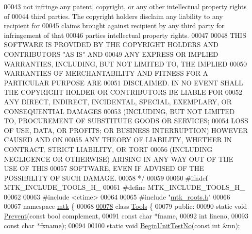 \begin{DoxyCode}
00043 \textcolor{comment}{not infringe any patent, copyright, or any other intellectual property rights of}
00044 \textcolor{comment}{third parties. The copyright holders disclaim any liability to any recipient for}
00045 \textcolor{comment}{claims brought against recipient by any third party for infringement of that}
00046 \textcolor{comment}{parties intellectual property rights.}
00047 \textcolor{comment}{}
00048 \textcolor{comment}{THIS SOFTWARE IS PROVIDED BY THE COPYRIGHT HOLDERS AND CONTRIBUTORS "AS IS" AND}
00049 \textcolor{comment}{ANY EXPRESS OR IMPLIED WARRANTIES, INCLUDING, BUT NOT LIMITED TO, THE IMPLIED}
00050 \textcolor{comment}{WARRANTIES OF MERCHANTABILITY AND FITNESS FOR A PARTICULAR PURPOSE ARE}
00051 \textcolor{comment}{DISCLAIMED. IN NO EVENT SHALL THE COPYRIGHT HOLDER OR CONTRIBUTORS BE LIABLE FOR}
00052 \textcolor{comment}{ANY DIRECT, INDIRECT, INCIDENTAL, SPECIAL, EXEMPLARY, OR CONSEQUENTIAL DAMAGES}
00053 \textcolor{comment}{(INCLUDING, BUT NOT LIMITED TO, PROCUREMENT OF SUBSTITUTE GOODS OR SERVICES;}
00054 \textcolor{comment}{LOSS OF USE, DATA, OR PROFITS; OR BUSINESS INTERRUPTION) HOWEVER CAUSED AND ON}
00055 \textcolor{comment}{ANY THEORY OF LIABILITY, WHETHER IN CONTRACT, STRICT LIABILITY, OR TORT}
00056 \textcolor{comment}{(INCLUDING NEGLIGENCE OR OTHERWISE) ARISING IN ANY WAY OUT OF THE USE OF THIS}
00057 \textcolor{comment}{SOFTWARE, EVEN IF ADVISED OF THE POSSIBILITY OF SUCH DAMAGE.}
00058 \textcolor{comment}{*/}
00059 
00060 \textcolor{preprocessor}{#ifndef MTK\_INCLUDE\_TOOLS\_H\_}
00061 \textcolor{preprocessor}{#define MTK\_INCLUDE\_TOOLS\_H\_}
00062 
00063 \textcolor{preprocessor}{#include <ctime>}
00064 
00065 \textcolor{preprocessor}{#include "\hyperlink{mtk__roots_8h}{mtk\_roots.h}"}
00066 
00067 \textcolor{keyword}{namespace }\hyperlink{namespacemtk}{mtk} \{
00068 
\hypertarget{mtk__tools_8h_source_l00078}{}\hyperlink{classmtk_1_1Tools}{00078} \textcolor{keyword}{class }\hyperlink{classmtk_1_1Tools}{Tools} \{
00079  \textcolor{keyword}{public}:
00090   \textcolor{keyword}{static} \textcolor{keywordtype}{void} \hyperlink{classmtk_1_1Tools_afe5bb096309258e2e72503fd7b41c7e0}{Prevent}(\textcolor{keyword}{const} \textcolor{keywordtype}{bool} complement,
00091                       \textcolor{keyword}{const} \textcolor{keywordtype}{char} *fname,
00092                       \textcolor{keywordtype}{int} lineno,
00093                       \textcolor{keyword}{const} \textcolor{keywordtype}{char} *fxname);
00094 
00100   \textcolor{keyword}{static} \textcolor{keywordtype}{void} \hyperlink{classmtk_1_1Tools_a26ee906d28523378522a75e25c3a4e19}{BeginUnitTestNo}(\textcolor{keyword}{const} \textcolor{keywordtype}{int} &nn);

\end{DoxyCode}

